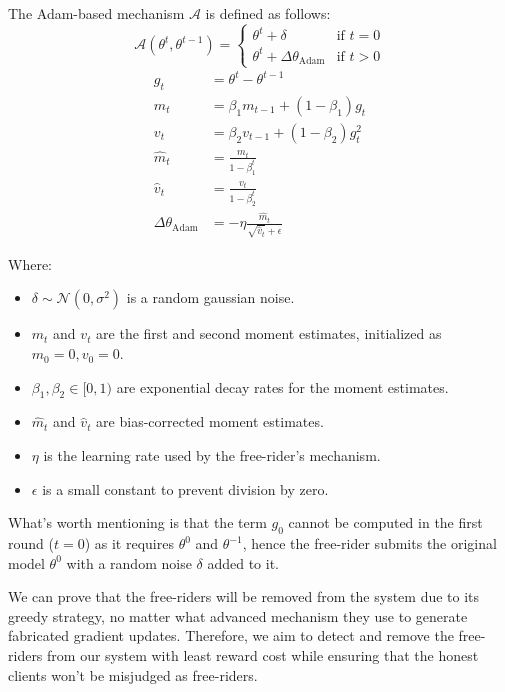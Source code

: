 \documentclass[conference]{IEEEtran}
\begin{document}
The Adam-based mechanism $\mathcal{A}$ is defined as follows:
\begin{equation}
    \mathcal{A}(\theta^t, \theta^{t-1}) =
    \begin{cases}
        \theta^t + \delta & \text{if } t = 0 \\
        \theta^t + \Delta\theta_{\text{Adam}} & \text{if } t > 0
    \end{cases}
    \label{eq:adam_adversary}
\end{equation}
\begin{align}
    g_t &= \theta^t - \theta^{t-1} \\
    m_t &= \beta_1 m_{t-1} + (1-\beta_1)g_t \\
    v_t &= \beta_2 v_{t-1} + (1-\beta_2)g_t^2 \\
    \hat{m}_t &= \frac{m_t}{1-\beta_1^t} \\
    \hat{v}_t &= \frac{v_t}{1-\beta_2^t} \\
    \Delta\theta_{\text{Adam}} &= -\eta\frac{\hat{m}_t}{\sqrt{\hat{v}_t} + \epsilon} \label{eq:adam_update}
\end{align}
\vspace{4em}

Where:
\begin{itemize}
    \item $\delta \sim \mathcal{N}(0, \sigma^2)$ is a random gaussian noise.
    \item $m_t$ and $v_t$ are the first and second moment estimates, initialized as $m_0 = 0, v_0 = 0$.
    \item $\beta_1, \beta_2 \in [0,1)$ are exponential decay rates for the moment estimates.
    \item $\hat{m}_t$ and $\hat{v}_t$ are bias-corrected moment estimates.
    \item $\eta$ is the learning rate used by the free-rider's mechanism.
    \item $\epsilon$ is a small constant to prevent division by zero.
\end{itemize}

\vspace{1em}
What's worth mentioning is that the term $g_0$ cannot be computed in the first round ($t=0$) as it requires $\theta^0$ and $\theta^{-1}$, hence the free-rider submits the original model $\theta^0$ with a random noise $\delta$ added to it.

We can prove that the free-riders will be removed from the system due to its greedy strategy, no matter what advanced mechanism they use to generate fabricated gradient updates.
Therefore, we aim to detect and remove the free-riders from our system with least reward cost while ensuring that the honest clients won't be misjudged as free-riders.
\end{document}
